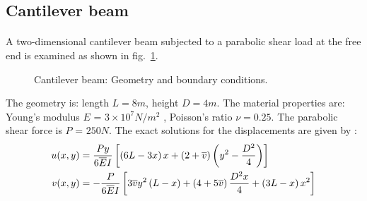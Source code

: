 

\subsection{Cantilever beam}
\paragraph{}
A two-dimensional cantilever beam subjected to a parabolic shear load at the free end is examined as shown
in fig.~\ref{fig:cantilever_beam_geo_bc}.
    \begin{figure}[h!]
    \centering
        \caption{ Cantilever beam: Geometry and boundary conditions.}
        \label{fig:cantilever_beam_geo_bc}
    \end{figure}

The geometry is: length $L=8m$, height $D=4m$.
The material properties are: Young’s modulus $E$ = $3 \times 10^7 N/m^2$ , Poisson’s ratio $ν=0.25$.
The parabolic shear force is $P$ = $250 N$.
The exact solutions for the displacements are given by \cite{Aug2008}:
    \begin{equation}
        \begin{aligned}
            u(x,y) &= 
                \frac{Py}{6 \overline{E} I}
                \left[
                    \left(
                        6L-3x
                    \right)x
                    +\left(
                        2+ \overline{v}
                    \right)\left(
                        y^2-\frac{D^2}{4}
                    \right)
                \right]
            \\
            v(x,y) &=  
                -\frac{P}{6 \overline{E} I}
                \left[
                    3 \overline{v} y^2 \left(
                        L-x
                    \right)+
                    \left(
                        4+5 \overline{v}
                    \right)\frac{D^2x}{4}+
                    \left(
                        3L-x
                    \right)x^2
                \right]        
        \end{aligned}
    \label{eq:cantilever_beam_displacement_solution}
    \end{equation}


